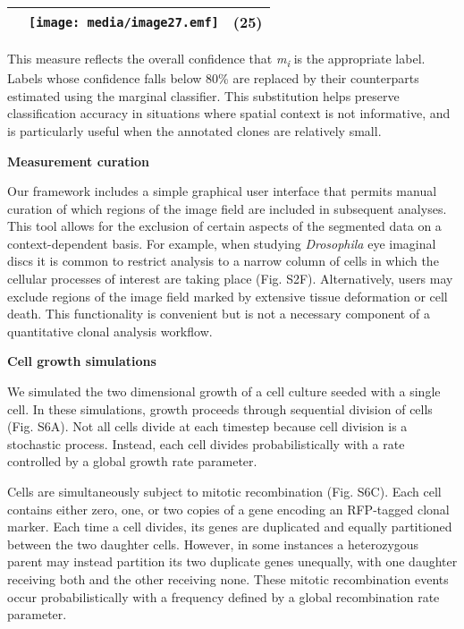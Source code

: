 \begin{longtable}[]{@{}lll@{}}
\toprule
& \texttt{[image: media/image27.emf]} & (25)\tabularnewline
\bottomrule
\end{longtable}

This measure reflects the overall confidence that \emph{m\textsubscript{i}} is the appropriate label. Labels whose confidence falls below 80\% are replaced by their counterparts estimated using the marginal classifier. This substitution helps preserve classification accuracy in situations where spatial context is not informative, and is particularly useful when the annotated clones are relatively small.

\textbf{Measurement curation}

Our framework includes a simple graphical user interface that permits manual curation of which regions of the image field are included in subsequent analyses. This tool allows for the exclusion of certain aspects of the segmented data on a context-dependent basis. For example, when studying \emph{Drosophila} eye imaginal discs it is common to restrict analysis to a narrow column of cells in which the cellular processes of interest are taking place (Fig. S2F). Alternatively, users may exclude regions of the image field marked by extensive tissue deformation or cell death. This functionality is convenient but is not a necessary component of a quantitative clonal analysis workflow.

\textbf{Cell growth simulations}

We simulated the two dimensional growth of a cell culture seeded with a single cell. In these simulations, growth proceeds through sequential division of cells (Fig. S6A). Not all cells divide at each timestep because cell division is a stochastic process. Instead, each cell divides probabilistically with a rate controlled by a global growth rate parameter.

Cells are simultaneously subject to mitotic recombination (Fig. S6C). Each cell contains either zero, one, or two copies of a gene encoding an RFP-tagged clonal marker. Each time a cell divides, its genes are duplicated and equally partitioned between the two daughter cells. However, in some instances a heterozygous parent may instead partition its two duplicate genes unequally, with one daughter receiving both and the other receiving none. These mitotic recombination events occur probabilistically with a frequency defined by a global recombination rate parameter.

